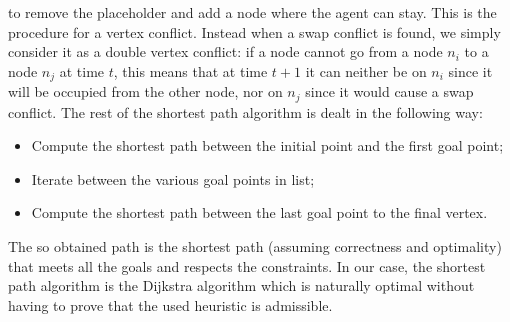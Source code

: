 to remove the placeholder and add a node where the agent can stay. \newline
This is the procedure for a vertex conflict. Instead when a swap conflict is
found, we simply consider it as a double vertex conflict: if a node cannot go
from a node $n_i$ to a node $n_j$ at time $t$, this means that at time $t+1$ it
can neither be on $n_i$ since it will be occupied from the other node, nor on
$n_j$ since it would cause a swap conflict. \newline
The rest of the shortest path algorithm is dealt in the following way:
\begin{itemize}
  \item Compute the shortest path between the initial point and the first goal
    point; 
  \item Iterate between the various goal points in list;
  \item Compute the shortest path between the last goal point to the final
    vertex.
\end{itemize}
The so obtained path is the shortest path (assuming correctness and optimality)
that meets all the goals and respects the constraints. \newline
In our case, the shortest path algorithm is the Dijkstra algorithm which is
naturally optimal without having to prove that the used heuristic is
admissible.
%
%
